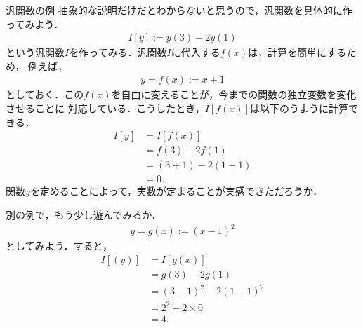                 \begin{mysmallsec}{汎関数の例}
                    抽象的な説明だけだとわからないと思うので，汎関数を具体的に作ってみよう．
                    \begin{align*}
                        I[y] := y(3) - 2y(1)
                    \end{align*}
                    という汎関数$I$を作ってみる．汎関数$I$に代入する$f(x)$は，計算を簡単にするため，
                    例えば，
                    \begin{align*}
                        y = f(x) := x + 1
                    \end{align*}
                    としておく．この$f(x)$を自由に変えることが，今までの関数の独立変数を変化させることに
                    対応している．こうしたとき，$I[f(x)]$は以下のうように計算できる．
                    \begin{align*}
                        I[y] &= I[f(x)]            \\
                             &= f(3) - 2f(1)       \\
                             &= (3 + 1) - 2(1 + 1) \\
                             &= 0.
                    \end{align*}
                    関数$y$を定めることによって，実数が定まることが実感できただろうか．

                    別の例で，もう少し遊んでみるか．
                    \begin{align*}
                        y = g(x) := {(x - 1)}^{2}
                    \end{align*}
                    としてみよう．すると，
                    \begin{align*}
                        I[(y)] &= I[g(x)]                           \\
                               &= g(3) - 2g(1)                      \\
                               &= {(3 - 1)}^{2} - 2 {(1 - 1)}^{2}   \\
                               &= {2}^{2} - 2 \times 0              \\
                               &= 4.
                    \end{align*}


\end{mysmallsec}
